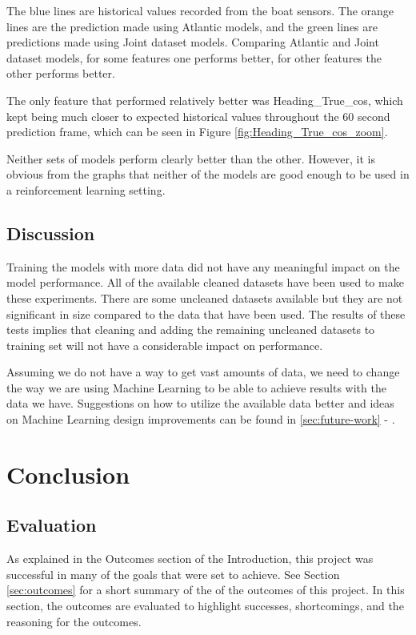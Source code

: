 \documentclass[12pt,twoside]{report}
\begin{document}
The blue lines are historical values recorded from the boat sensors. The orange lines are the prediction made using Atlantic models, and the green lines are predictions made using Joint dataset models. Comparing Atlantic and Joint dataset models, for some features one performs better, for other features the other performs better. 

The only feature that performed relatively better was Heading\_True\_cos, which kept being much closer to expected historical values throughout the 60 second prediction frame, which can be seen in Figure \ref{fig:Heading_True_cos_zoom}.

Neither sets of models perform clearly better than the other. However, it is obvious from the graphs that neither of the models are good enough to be used in a reinforcement learning setting.


\section{Discussion}
Training the models with more data did not have any meaningful impact on the model performance. All of the available cleaned datasets have been used to make these experiments. There are some uncleaned datasets available but they are not significant in size compared to the data that have been used. The results of these tests implies that cleaning and adding the remaining uncleaned datasets to training set will not have a considerable impact on performance.

Assuming we do not have a way to get vast amounts of data, we need to change the way we are using Machine Learning to be able to achieve results with the data we have. Suggestions on how to utilize the available data better and ideas on Machine Learning design improvements can be found in \ref{sec:future-work} - .


\chapter{Conclusion}

\section{Evaluation}
As explained in the Outcomes section of the Introduction, this project was successful in many of the goals that were set to achieve. See Section \ref{sec:outcomes} for a short summary of the of the outcomes of this project. In this section, the outcomes are evaluated to highlight successes, shortcomings, and the reasoning for the outcomes.
\end{document}
